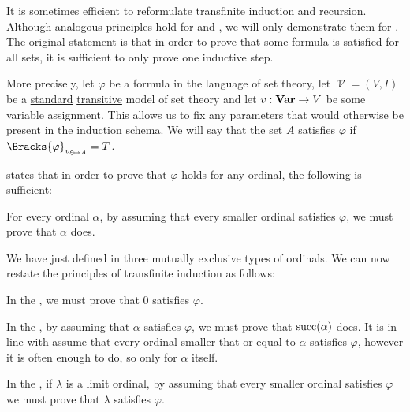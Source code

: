\begin{remark}\label{rem:transfinite_induction}
  It is sometimes efficient to reformulate transfinite induction and recursion. Although analogous principles hold for  and , we will only demonstrate them for . The original statement is that in order to prove that some formula is satisfied for all sets, it is sufficient to only prove one inductive step.

  More precisely, let \( \varphi \) be a formula in the language of set theory, let \( \mscrV = (V, I) \) be a \hyperref[rem:standard_model_of_set_theory]{standard} \hyperref[rem:transitive_model_of_set_theory]{transitive} model of set theory and let \( v: \operatorname{\mathbf{Var}} \to V \) be some variable assignment. This allows us to fix any parameters that would otherwise be present in the induction schema. We will say that the set \( A \) satisfies \( \varphi \) if \( \Bracks{\varphi}_{v_{\xi \mapsto A}} = T \).

   states that in order to prove that \( \varphi \) holds for any ordinal, the following is sufficient:
  \begin{thmenum}[series=rem:transfinite_induction]
     For every ordinal \( \alpha \), by assuming that every smaller ordinal satisfies \( \varphi \), we must prove that \( \alpha \) does.
  \end{thmenum}

  We have just defined in  three mutually exclusive types of ordinals. We can now restate the principles of transfinite induction as follows:
  \begin{thmenum}[resume=rem:transfinite_induction]
     In the , we must prove that \( 0 \) satisfies \( \varphi \).

     In the , by assuming that \( \alpha \) satisfies \( \varphi \), we must prove that \( \operatorname{succ}(\alpha) \) does. It is in line with  assume that every ordinal smaller that or equal to \( \alpha \) satisfies \( \varphi \), however it is often enough to do, so only for \( \alpha \) itself.

     In the , if \( \lambda \) is a limit ordinal, by assuming that every smaller ordinal satisfies \( \varphi \) we must prove that \( \lambda \) satisfies \( \varphi \).
  \end{thmenum}


\end{remark}
